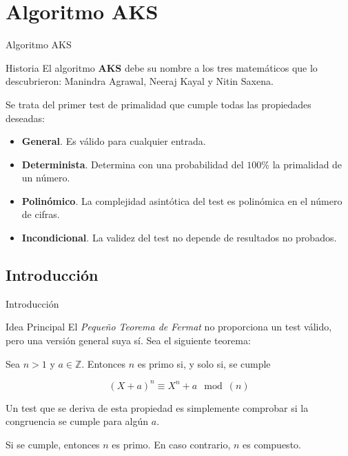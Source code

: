 \documentclass{beamer}
\begin{document}
\section{Algoritmo AKS}

\begin{frame}
	\centering
	\begin{Huge}
		Algoritmo AKS
	\end{Huge}
\end{frame}

\begin{frame}{Historia}
	\onslide<1->El algoritmo \textbf{AKS} debe su nombre a los tres matemáticos que lo descubrieron: Manindra Agrawal, Neeraj Kayal y Nitin Saxena.\break
	
	Se trata del primer test de primalidad que cumple todas las propiedades deseadas:\break
	
	\begin{itemize}[<+(2)->]
		\item \textbf{General}. Es válido para cualquier entrada.
		
		\item \textbf{Determinista}. Determina con una probabilidad del $100\%$ la primalidad de un número.
		
		\item \textbf{Polinómico}. La complejidad asintótica del test es polinómica en el número de cifras.
		
		\item \textbf{Incondicional}. La validez del test no depende de resultados no probados.
	\end{itemize}
\end{frame}

\subsection{Introducción}

\begin{frame}
	\centering
	\begin{Large}
		Introducción
	\end{Large}
\end{frame}

\begin{frame}{Idea Principal}
	\onslide<1->El \textit{Pequeño Teorema de Fermat} no proporciona un test válido, pero una versión general suya sí. Sea el siguiente teorema:\break
	
	\begin{theorem}
		Sea $n > 1$ y $a \in \mathbb{Z}$. Entonces $n$ es primo si, y solo si, se cumple
		
		\begin{equation*}
		(X + a)^n \equiv X^n + a \mod(n)
		\end{equation*}
	\end{theorem}
	
	Un test que se deriva de esta propiedad es simplemente comprobar si la congruencia se cumple para algún $a$.\break
	
	Si se cumple, entonces $n$ es primo. En caso contrario, $n$ es compuesto.
\end{frame}
\end{document}
